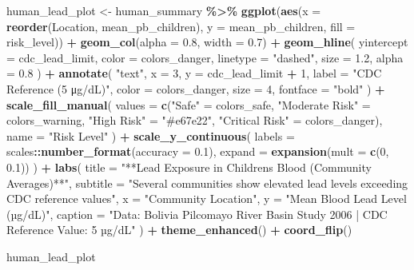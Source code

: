 \documentclass[
]{article}
\newenvironment{Shaded}{\begin{snugshade}}{\end{snugshade}}
\newcommand{\AttributeTok}[1]{\textcolor[rgb]{0.13,0.29,0.53}{#1}}
\newcommand{\DecValTok}[1]{\textcolor[rgb]{0.00,0.00,0.81}{#1}}
\newcommand{\FloatTok}[1]{\textcolor[rgb]{0.00,0.00,0.81}{#1}}
\newcommand{\FunctionTok}[1]{\textcolor[rgb]{0.13,0.29,0.53}{\textbf{#1}}}
\newcommand{\NormalTok}[1]{#1}
\newcommand{\OtherTok}[1]{\textcolor[rgb]{0.56,0.35,0.01}{#1}}
\newcommand{\SpecialCharTok}[1]{\textcolor[rgb]{0.81,0.36,0.00}{\textbf{#1}}}
\newcommand{\StringTok}[1]{\textcolor[rgb]{0.31,0.60,0.02}{#1}}
\begin{document}
\begin{Shaded}
\begin{Highlighting}[]
\NormalTok{human\_lead\_plot }\OtherTok{\textless{}{-}}\NormalTok{ human\_summary }\SpecialCharTok{\%\textgreater{}\%}
  \FunctionTok{ggplot}\NormalTok{(}\FunctionTok{aes}\NormalTok{(}\AttributeTok{x =} \FunctionTok{reorder}\NormalTok{(Location, mean\_pb\_children), }\AttributeTok{y =}\NormalTok{ mean\_pb\_children, }\AttributeTok{fill =}\NormalTok{ risk\_level)) }\SpecialCharTok{+}
  \FunctionTok{geom\_col}\NormalTok{(}\AttributeTok{alpha =} \FloatTok{0.8}\NormalTok{, }\AttributeTok{width =} \FloatTok{0.7}\NormalTok{) }\SpecialCharTok{+}
  \FunctionTok{geom\_hline}\NormalTok{(}
    \AttributeTok{yintercept =}\NormalTok{ cdc\_lead\_limit, }
    \AttributeTok{color =}\NormalTok{ colors\_danger, }
    \AttributeTok{linetype =} \StringTok{"dashed"}\NormalTok{, }
    \AttributeTok{size =} \FloatTok{1.2}\NormalTok{,}
    \AttributeTok{alpha =} \FloatTok{0.8}
\NormalTok{  ) }\SpecialCharTok{+}
  \FunctionTok{annotate}\NormalTok{(}
    \StringTok{"text"}\NormalTok{,}
    \AttributeTok{x =} \DecValTok{3}\NormalTok{, }\AttributeTok{y =}\NormalTok{ cdc\_lead\_limit }\SpecialCharTok{+} \DecValTok{1}\NormalTok{,}
    \AttributeTok{label =} \StringTok{"CDC Reference (5 μg/dL)"}\NormalTok{,}
    \AttributeTok{color =}\NormalTok{ colors\_danger,}
    \AttributeTok{size =} \DecValTok{4}\NormalTok{,}
    \AttributeTok{fontface =} \StringTok{"bold"}
\NormalTok{  ) }\SpecialCharTok{+}
  \FunctionTok{scale\_fill\_manual}\NormalTok{(}
    \AttributeTok{values =} \FunctionTok{c}\NormalTok{(}\StringTok{"Safe"} \OtherTok{=}\NormalTok{ colors\_safe, }
               \StringTok{"Moderate Risk"} \OtherTok{=}\NormalTok{ colors\_warning, }
               \StringTok{"High Risk"} \OtherTok{=} \StringTok{"\#e67e22"}\NormalTok{, }
               \StringTok{"Critical Risk"} \OtherTok{=}\NormalTok{ colors\_danger),}
    \AttributeTok{name =} \StringTok{"Risk Level"}
\NormalTok{  ) }\SpecialCharTok{+}
  \FunctionTok{scale\_y\_continuous}\NormalTok{(}
    \AttributeTok{labels =}\NormalTok{ scales}\SpecialCharTok{::}\FunctionTok{number\_format}\NormalTok{(}\AttributeTok{accuracy =} \FloatTok{0.1}\NormalTok{),}
    \AttributeTok{expand =} \FunctionTok{expansion}\NormalTok{(}\AttributeTok{mult =} \FunctionTok{c}\NormalTok{(}\DecValTok{0}\NormalTok{, }\FloatTok{0.1}\NormalTok{))}
\NormalTok{  ) }\SpecialCharTok{+}
  \FunctionTok{labs}\NormalTok{(}
    \AttributeTok{title =} \StringTok{"**Lead Exposure in Children\textquotesingle{}s Blood (Community Averages)**"}\NormalTok{,}
    \AttributeTok{subtitle =} \StringTok{"Several communities show elevated lead levels exceeding CDC reference values"}\NormalTok{,}
    \AttributeTok{x =} \StringTok{"Community Location"}\NormalTok{,}
    \AttributeTok{y =} \StringTok{"Mean Blood Lead Level (µg/dL)"}\NormalTok{,}
    \AttributeTok{caption =} \StringTok{"Data: Bolivia Pilcomayo River Basin Study 2006 | CDC Reference Value: 5 µg/dL"}
\NormalTok{  ) }\SpecialCharTok{+}
  \FunctionTok{theme\_enhanced}\NormalTok{() }\SpecialCharTok{+}
  \FunctionTok{coord\_flip}\NormalTok{()}

\NormalTok{human\_lead\_plot}
\end{Highlighting}
\end{Shaded}
\end{document}
